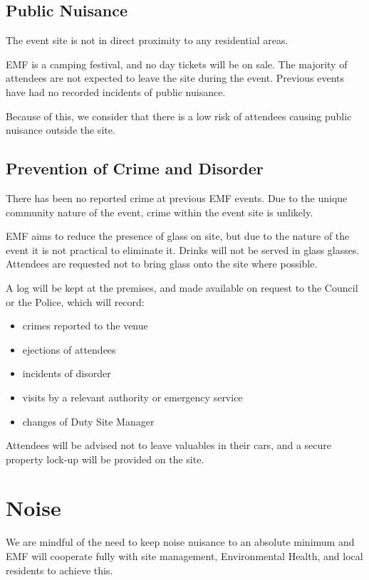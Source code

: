 \subsection{Public Nuisance}

The event site is not in direct proximity to any residential areas.

EMF is a camping festival, and no day tickets will be on sale. The majority of
attendees are not expected to leave the site during the event. Previous events
have had no recorded incidents of public nuisance.

Because of this, we consider that there is a low risk of attendees causing
public nuisance outside the site.

\subsection{Prevention of Crime and Disorder}

There has been no reported crime at previous EMF events. Due to the unique
community nature of the event, crime within the event site is unlikely.

EMF aims to reduce the presence of glass on site, but due to the nature of the
event it is not practical to eliminate it. Drinks will not be served in glass glasses.
Attendees are requested not to bring glass onto the site where possible.

A log will be kept at the premises, and made available on request to the Council
or the Police, which will record:

\begin{itemize}
\tightlist
    \item crimes reported to the venue
    \item ejections of attendees
    \item incidents of disorder
    \item visits by a relevant authority or emergency service
    \item changes of Duty Site Manager
\end{itemize}

Attendees will be advised not to leave valuables in their cars, and a secure property
lock-up will be provided on the site.

\newpage

\section{Noise}
\label{noise}
We are mindful of the need to keep noise nuisance to an absolute minimum and
EMF will cooperate fully with site management, Environmental Health, and local
residents to achieve this.

